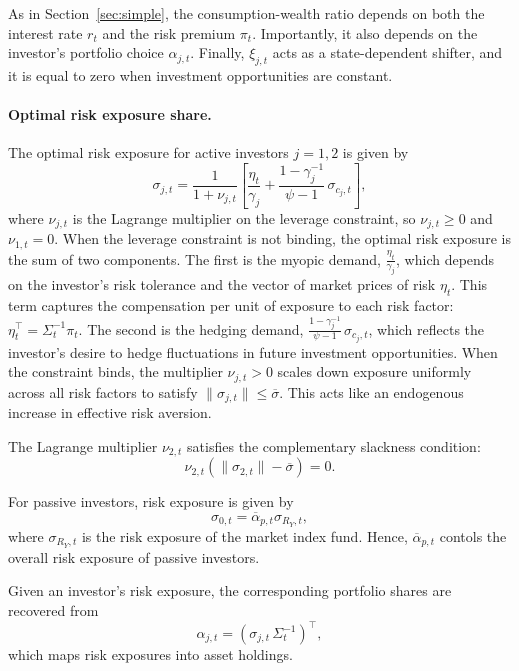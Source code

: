 \documentclass[12pt,english]{article}
\begin{document}
As in Section~\ref{sec:simple}, the consumption-wealth ratio depends on both the interest rate $r_t$ and the risk premium $\pi_t$.
Importantly, it also depends on the investor's portfolio choice $\alpha_{j,t}$.
Finally, $\xi_{j,t}$ acts as a state-dependent shifter, and it is equal to zero when investment opportunities are constant.

\paragraph{Optimal risk exposure share.}
The optimal risk exposure for active investors $j = 1,2$ is given by
\begin{equation}\label{eq:risk_exposure}
    \sigma_{j,t}
    = \frac{1}{1+\nu_{j,t}} \left[ \frac{\eta_t}{\gamma_j} + \frac{1-\gamma_j^{-1}}{\psi-1} \, \sigma_{c_j,t} \right],
\end{equation}
where $\nu_{j,t}$ is the Lagrange multiplier on the leverage constraint, so $\nu_{j,t} \ge 0$ and $\nu_{1,t} = 0$.
When the leverage constraint is not binding, the optimal risk exposure is the sum of two components.
The first is the myopic demand, $\frac{\eta_t}{\gamma_j}$, which depends on the investor's risk tolerance and the vector of market prices of risk $\eta_t$.
This term captures the compensation per unit of exposure to each risk factor: $\eta_t^\top = \Sigma_t^{-1} \pi_t$.
The second is the hedging demand, $\frac{1-\gamma_j^{-1}}{\psi-1} \, \sigma_{c_j,t}$, which reflects the investor's desire to hedge fluctuations in future investment opportunities.
When the constraint binds, the multiplier $\nu_{j,t} > 0$ scales down exposure uniformly across all risk factors to satisfy $\|\sigma_{j,t}\| \le \overline{\sigma}$.
This acts like an endogenous increase in effective risk aversion.

The Lagrange multiplier $\nu_{2,t}$ satisfies the complementary slackness condition:
\begin{equation}
    \nu_{2,t} \left( \|\sigma_{2,t}\| - \overline{\sigma} \right) = 0.
\end{equation}

For passive investors, risk exposure is given by
\begin{equation}
    \sigma_{0,t} = \overline{\alpha}_{p,t} \sigma_{R_Y,t},
\end{equation}
where $\sigma_{R_Y,t}$ is the risk exposure of the market index fund.
Hence, $\overline{\alpha}_{p,t}$ contols the overall risk exposure of passive investors.

Given an investor's risk exposure, the corresponding portfolio shares are recovered from
\[
\alpha_{j,t} = \left(\sigma_{j,t} \, \Sigma_t^{-1}\right)^\top,
\]
which maps risk exposures into asset holdings.
\end{document}
